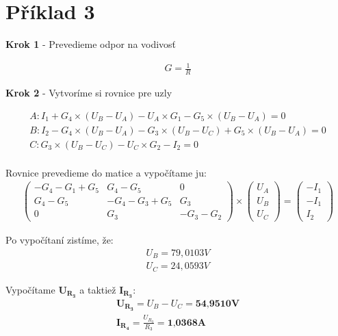 \section{Příklad 3}

\begin{center}
    \textbf{Krok 1} - Prevedieme odpor na vodivosť
\end{center}

\begin{gather*}
    G = \frac{1}{R}
\end{gather*}

\begin{center}
    \textbf{Krok 2} - Vytvoríme si rovnice pre uzly
\end{center}
\begin{gather*}
    A: I_{1} + G_{4} \times (U_{B} - U_{A}) - U_{A} \times G_{1} - G_{5} \times (U_{B} - U_{A}) = 0\\
    B: I_{2} - G_{4} \times (U_{B} - U_{A}) - G_{3} \times (U_{B} - U_{C}) + G_{5} \times (U_{B} - U_{A}) = 0\\
    C: G_{3} \times (U_{B} - U_{C}) - U_{C} \times G_{2} - I_{2} = 0\\
\end{gather*}

Rovnice prevedieme do matice a vypočítame ju:
\begin{gather*}
    \begin{pmatrix}
        -G_{4} - G_{1} + G_{5} & G_{4} - G_{5} & 0 \\
        G_{4} - G_{5} & -G_{4} - G_{3} + G_{5} & G_{3} \\
        0 & G_{3} & -G_{3} - G_{2}
    \end{pmatrix}
    \times
    \begin{pmatrix}
        U_{A} \\
        U_{B} \\
        U_{C}
    \end{pmatrix}
    =
    \begin{pmatrix}
        -I_1 \\
        -I_1 \\
        I_2
    \end{pmatrix}
\end{gather*}

Po vypočítaní zistíme, že:
\begin{gather*}
    U_B = 79,0103V \\
    U_C = 24,0593V
\end{gather*}

Vypočítame $\boldsymbol{U_{R_3}}$ a taktiež $\boldsymbol{I_{R_3}}$:
\begin{gather*}
    \boldsymbol{U_{R_3}} = U_B - U_C = \textbf{54,9510V} \\
    \boldsymbol{I_{R_4}} = \frac{U_{R_3}}{R_3} = \textbf{1,0368A}
\end{gather*}